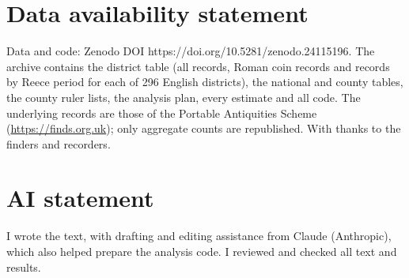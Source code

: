 \documentclass[11pt,a4paper]{article}
\begin{document}
\section*{Data availability statement}
Data and code: Zenodo DOI https://doi.org/10.5281/zenodo.24115196. The archive contains the district table (all records, Roman coin records and records by Reece period for each of 296 English districts), the national and county tables, the county ruler lists, the analysis plan, every estimate and all code. The underlying records are those of the Portable Antiquities Scheme (\url{https://finds.org.uk}); only aggregate counts are republished. With thanks to the finders and recorders.

\section*{AI statement}
I wrote the text, with drafting and editing assistance from Claude (Anthropic), which also helped prepare the analysis code. I reviewed and checked all text and results.
\end{document}
